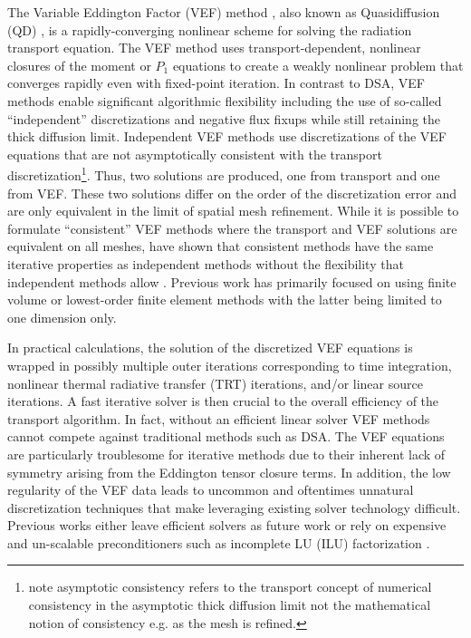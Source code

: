 \documentclass[doc.tex]{subfiles}
\begin{document}
The Variable Eddington Factor (VEF) method \cite{mihalas}, also known as Quasidiffusion (QD) \cite{goldin}, is a rapidly-converging nonlinear scheme for solving the radiation transport equation. The VEF method uses transport-dependent, nonlinear closures of the moment or $P_1$ equations to create a weakly nonlinear problem that converges rapidly even with fixed-point iteration. In contrast to DSA, VEF methods enable significant algorithmic flexibility including the use of so-called ``independent'' discretizations \cite{two-level-independent-warsa,me,olivier_mandc} and negative flux fixups \cite{YEE2020109696} while still retaining the thick diffusion limit. Independent VEF methods use discretizations of the VEF equations that are not asymptotically consistent with the transport discretization\footnote{note asymptotic consistency refers to the transport concept of numerical consistency in the asymptotic thick diffusion limit not the mathematical notion of consistency e.g. as the mesh is refined.}. Thus, two solutions are produced, one from transport and one from VEF. These two solutions differ on the order of the discretization error and are only equivalent in the limit of spatial mesh refinement. While it is possible to formulate ``consistent'' VEF methods where the transport and VEF solutions are equivalent on all meshes, \citeauthor{two-level-independent-warsa} have shown that consistent methods have the same iterative properties as independent methods without the flexibility that independent methods allow \cite{two-level-independent-warsa}. Previous work has primarily focused on using finite volume \cite{weasel,wieselquist,Jones2019TheQM} or lowest-order finite element methods \cite{two-level-independent-warsa,ho_trt_maginot,LOU2019258} with the latter being limited to one dimension only. 

In practical calculations, the solution of the discretized VEF equations is wrapped in possibly multiple outer iterations corresponding to time integration, nonlinear thermal radiative transfer (TRT) iterations, and/or linear source iterations. A fast iterative solver is then crucial to the overall efficiency of the transport algorithm. In fact, without an efficient linear solver VEF methods cannot compete against traditional methods such as DSA. The VEF equations are particularly troublesome for iterative methods due to their inherent lack of symmetry arising from the Eddington tensor closure terms. In addition, the low regularity of the VEF data leads to uncommon and oftentimes unnatural discretization techniques that make leveraging existing solver technology difficult. Previous works either leave efficient solvers as future work \cite{two-level-independent-warsa,me,LOU2019258} or rely on expensive and un-scalable preconditioners such as incomplete LU (ILU) factorization \cite{weasel}. 
\end{document}
